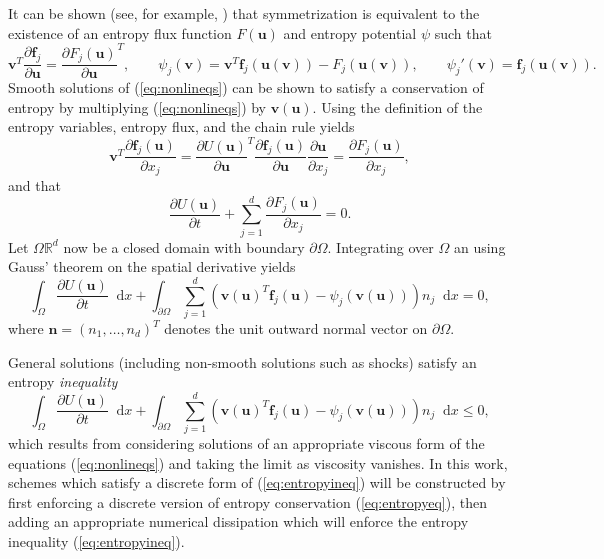 \documentclass[preprint,10pt]{article}
\theoremstyle{definition}
\theoremstyle{lemma}
\theoremstyle{theorem}
\theoremstyle{assumption}
\newcommand{\pd}[2]{\frac{\partial#1}{\partial#2}}
\newcommand{\LRp}[1]{\left( #1 \right)}
\newcommand*\diff[1]{\mathop{}\!{\mathrm{d}#1}} %
\begin{document}
It can be shown (see, for example, \cite{mock1980systems}) that symmetrization is equivalent to the existence of an entropy flux function $F(\bm{u})$ and entropy potential $\psi$ such that
\[
\bm{v}^T \pd{\bm{f}_j}{\bm{u}} = \pd{F_j(\bm{u})}{\bm{u}}^T, \qquad \psi_j(\bm{v}) = \bm{v}^T\bm{f}_j(\bm{u}(\bm{v})) - F_j(\bm{u}(\bm{v})), \qquad \psi_j'(\bm{v}) = \bm{f}_j(\bm{u}(\bm{v})).
\]
Smooth solutions of (\ref{eq:nonlineqs}) can be shown to satisfy a conservation of entropy by multiplying (\ref{eq:nonlineqs}) by $\bm{v}(\bm{u})$. Using the definition of the entropy variables, entropy flux, and the chain rule yields 
\begin{equation}
\bm{v}^T\pd{\bm{f}_j(\bm{u})}{x_j} = \pd{U(\bm{u})}{\bm{u}}^T\pd{\bm{f}_j(\bm{u})}{\bm{u}}\pd{\bm{u}}{x_j} = \pd{F_j(\bm{u})}{x_j},
\label{eq:chainrule}
\end{equation}
and that 
\begin{equation*}
\pd{U(\bm{u})}{t} + \sum_{j=1}^d \pd{F_j(\bm{u})}{x_j} = 0.
\end{equation*}
Let $\Omega\mathbb{R}^d$ now be a closed domain with boundary $\partial \Omega$.  Integrating over $\Omega$ an using Gauss' theorem on the spatial derivative yields
\begin{equation}
\int_{\Omega}\pd{U(\bm{u})}{t}\diff{x} + \int_{\partial \Omega} \sum_{j=1}^d \LRp{\bm{v}(\bm{u})^T\bm{f}_j(\bm{u}) - \psi_j\LRp{\bm{v}(\bm{u})}}n_j \diff{x} = 0,
\label{eq:entropyeq}
\end{equation}
where $\bm{n} = \LRp{n_1,\ldots,n_d}^T$ denotes the unit outward normal vector on $\partial \Omega$.  

General solutions (including non-smooth solutions such as shocks) satisfy an entropy \emph{inequality}
\begin{equation}
\int_{\Omega}\pd{U(\bm{u})}{t}\diff{x} + \int_{\partial \Omega} \sum_{j=1}^d \LRp{\bm{v}(\bm{u})^T\bm{f}_j(\bm{u}) - \psi_j\LRp{\bm{v}(\bm{u})}}n_j \diff{x} \leq 0,
\label{eq:entropyineq}
\end{equation}
which results from considering solutions of an appropriate viscous form of the equations (\ref{eq:nonlineqs}) and taking the limit as viscosity vanishes.  In this work, schemes which satisfy a discrete form of (\ref{eq:entropyineq}) will be constructed by first enforcing a discrete version of entropy conservation (\ref{eq:entropyeq}), then adding an appropriate numerical dissipation which will enforce the entropy inequality (\ref{eq:entropyineq}).  
\end{document}
